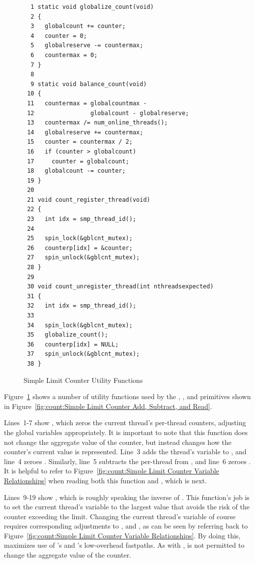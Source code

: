 \begin{figure}[tbp]
{ \scriptsize
\begin{verbatim}
  1 static void globalize_count(void)
  2 {
  3   globalcount += counter;
  4   counter = 0;
  5   globalreserve -= countermax;
  6   countermax = 0;
  7 }
  8 
  9 static void balance_count(void)
 10 {
 11   countermax = globalcountmax -
 12                globalcount - globalreserve;
 13   countermax /= num_online_threads();
 14   globalreserve += countermax;
 15   counter = countermax / 2;
 16   if (counter > globalcount)
 17     counter = globalcount;
 18   globalcount -= counter;
 19 }
 20 
 21 void count_register_thread(void)
 22 {
 23   int idx = smp_thread_id();
 24 
 25   spin_lock(&gblcnt_mutex);
 26   counterp[idx] = &counter;
 27   spin_unlock(&gblcnt_mutex);
 28 }
 29 
 30 void count_unregister_thread(int nthreadsexpected)
 31 {
 32   int idx = smp_thread_id();
 33 
 34   spin_lock(&gblcnt_mutex);
 35   globalize_count();
 36   counterp[idx] = NULL;
 37   spin_unlock(&gblcnt_mutex);
 38 }
\end{verbatim}
}
\caption{Simple Limit Counter Utility Functions}
\label{fig:count:Simple Limit Counter Utility Functions}
\end{figure}

Figure~\ref{fig:count:Simple Limit Counter Utility Functions}
shows a number of utility functions used by the ,
, and  primitives shown in
Figure~\ref{fig:count:Simple Limit Counter Add, Subtract, and Read}.

Lines~1-7 show , which zeros the current thread's
per-thread counters, adjusting the global variables appropriately.
It is important to note that this function does not change the aggregate
value of the counter, but instead changes how the counter's current value
is represented.
Line~3 adds the thread's  variable to ,
and line~4 zeroes .
Similarly, line~5 subtracts the per-thread  from
, and line~6 zeroes .
It is helpful to refer to
Figure~\ref{fig:count:Simple Limit Counter Variable Relationships}
when reading both this function and , which is next.

Lines~9-19 show , which is roughly speaking
the inverse of .
This function's job is to set the current thread's
 variable to the largest value that avoids the risk
of the counter exceeding the  limit.
Changing the current thread's  variable of course
requires corresponding adjustments to , 
and , as can be seen by referring back to
Figure~\ref{fig:count:Simple Limit Counter Variable Relationships}.
By doing this,  maximizes use of
's and 's low-overhead fastpaths.
As with ,  is not permitted
to change the aggregate value of the counter.

